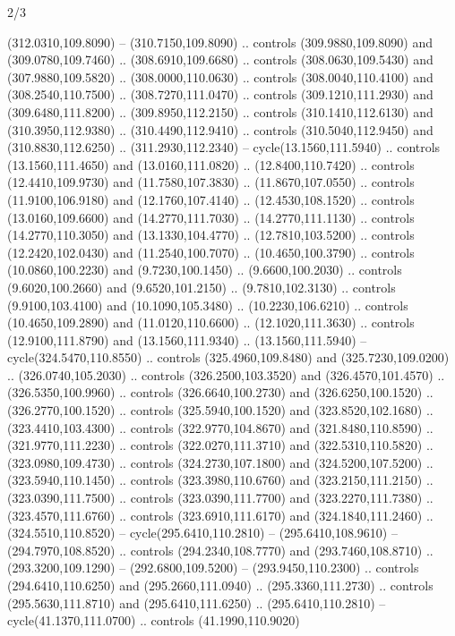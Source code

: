 \begin{flagdescription}{2/3}
\begin{scope}[xshift=0.5\flaglength,yshift=0.5\flagwidth,scale=\stretchfactor]
\begin{scope}[scale=0.001645\flagwidth,yshift=65mm,xshift=-63mm]
\begin{scope}[y=0.80pt, x=0.80pt, yscale=-1,]
\begin{scope}[cm={{1.33333,0.0,0.0,1.33333,(0.0,1e-05)}}]
  (312.0310,109.8090) -- (310.7150,109.8090) .. controls (309.9880,109.8090) and
  (309.0780,109.7460) .. (308.6910,109.6680) .. controls (308.0630,109.5430) and
  (307.9880,109.5820) .. (308.0000,110.0630) .. controls (308.0040,110.4100) and
  (308.2540,110.7500) .. (308.7270,111.0470) .. controls (309.1210,111.2930) and
  (309.6480,111.8200) .. (309.8950,112.2150) .. controls (310.1410,112.6130) and
  (310.3950,112.9380) .. (310.4490,112.9410) .. controls (310.5040,112.9450) and
  (310.8830,112.6250) .. (311.2930,112.2340) -- cycle(13.1560,111.5940) ..
  controls (13.1560,111.4650) and (13.0160,111.0820) .. (12.8400,110.7420) ..
  controls (12.4410,109.9730) and (11.7580,107.3830) .. (11.8670,107.0550) ..
  controls (11.9100,106.9180) and (12.1760,107.4140) .. (12.4530,108.1520) ..
  controls (13.0160,109.6600) and (14.2770,111.7030) .. (14.2770,111.1130) ..
  controls (14.2770,110.3050) and (13.1330,104.4770) .. (12.7810,103.5200) ..
  controls (12.2420,102.0430) and (11.2540,100.7070) .. (10.4650,100.3790) ..
  controls (10.0860,100.2230) and (9.7230,100.1450) .. (9.6600,100.2030) ..
  controls (9.6020,100.2660) and (9.6520,101.2150) .. (9.7810,102.3130) ..
  controls (9.9100,103.4100) and (10.1090,105.3480) .. (10.2230,106.6210) ..
  controls (10.4650,109.2890) and (11.0120,110.6600) .. (12.1020,111.3630) ..
  controls (12.9100,111.8790) and (13.1560,111.9340) .. (13.1560,111.5940) --
  cycle(324.5470,110.8550) .. controls (325.4960,109.8480) and
  (325.7230,109.0200) .. (326.0740,105.2030) .. controls (326.2500,103.3520) and
  (326.4570,101.4570) .. (326.5350,100.9960) .. controls (326.6640,100.2730) and
  (326.6250,100.1520) .. (326.2770,100.1520) .. controls (325.5940,100.1520) and
  (323.8520,102.1680) .. (323.4410,103.4300) .. controls (322.9770,104.8670) and
  (321.8480,110.8590) .. (321.9770,111.2230) .. controls (322.0270,111.3710) and
  (322.5310,110.5820) .. (323.0980,109.4730) .. controls (324.2730,107.1800) and
  (324.5200,107.5200) .. (323.5940,110.1450) .. controls (323.3980,110.6760) and
  (323.2150,111.2150) .. (323.0390,111.7500) .. controls (323.0390,111.7700) and
  (323.2270,111.7380) .. (323.4570,111.6760) .. controls (323.6910,111.6170) and
  (324.1840,111.2460) .. (324.5510,110.8520) -- cycle(295.6410,110.2810) --
  (295.6410,108.9610) -- (294.7970,108.8520) .. controls (294.2340,108.7770) and
  (293.7460,108.8710) .. (293.3200,109.1290) -- (292.6800,109.5200) --
  (293.9450,110.2300) .. controls (294.6410,110.6250) and (295.2660,111.0940) ..
  (295.3360,111.2730) .. controls (295.5630,111.8710) and (295.6410,111.6250) ..
  (295.6410,110.2810) -- cycle(41.1370,111.0700) .. controls (41.1990,110.9020)

\end{scope}
\end{scope}
\end{scope}
\end{scope}
\end{flagdescription}
